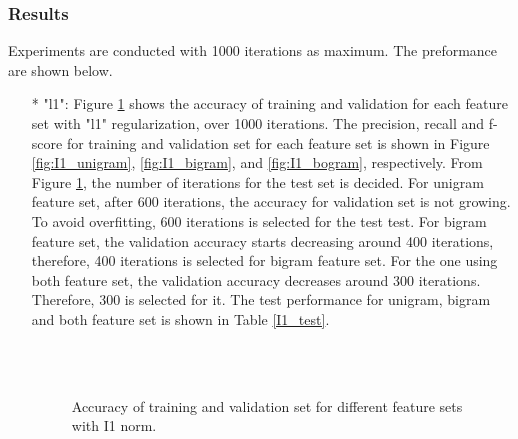 \documentclass[11pt]{article}
\begin{document}
\subsubsection{Results}
Experiments are conducted with 1000 iterations as maximum. The preformance are shown below.
\begin{itemize}
\item[*] "l1": Figure \ref{fig:I1_accuracy} shows the accuracy of training and validation for each feature set with "l1" regularization, over 1000 iterations. The precision, recall and f-score for training and validation set for each feature set is shown in Figure \ref{fig:I1_unigram}, \ref{fig:I1_bigram}, and \ref{fig:I1_bogram}, respectively. From Figure \ref{fig:I1_accuracy}, the number of iterations for the test set is decided. For unigram feature set, after 600 iterations, the accuracy for validation set is not growing. To avoid overfitting, 600 iterations is selected for the test test. For bigram feature set, the validation accuracy starts decreasing around 400 iterations, therefore, 400 iterations is selected for bigram feature set. For the one using both feature set, the validation accuracy decreases around 300 iterations. Therefore, 300 is selected for it. The test performance for unigram, bigram and both feature set is shown in Table \ref{I1_test}.
\begin{figure}[!h]
  \centering 
	\\%
	\\ %
  \caption{Accuracy of training and validation set for different feature sets with I1 norm.}
  \label{fig:I1_accuracy}
\end{figure}


\end{itemize}
\end{document}
